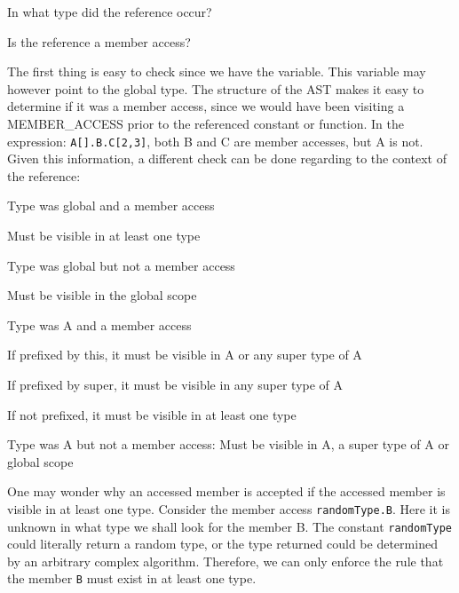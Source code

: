 \begin{nlist}
  \item In what type did the reference occur?
  \item Is the reference a member access?
\end{nlist}

The first thing is easy to check since we have the 
variable. This variable may however point to the global type. The structure of
the AST makes it easy to determine if it was a member access, since we would
have been visiting a MEMBER\_ACCESS  prior to the referenced
constant or function. In the expression: \texttt{A[].B.C[2,3]}, both B and C are
member accesses, but A is not. Given this information, a different check can be
done regarding to the context of the reference:

\begin{nlist}
  \item Type was global and a member access
  \begin{dlist}
    \item Must be visible in at least one type
  \end{dlist} 
  \item Type was global but not a member access
  \begin{dlist}
    \item Must be visible in the global scope
  \end{dlist}
  \item Type was A and a member access
  \begin{dlist}
    \item If prefixed by this, it must be visible in A or any super type of A
    \item If prefixed by super, it must be visible in any super type of A
    \item If not prefixed, it must be visible in at least one type
  \end{dlist}
  \item Type was A but not a member access: Must be visible in A, a super type
    of A or global scope
\end{nlist}

One may wonder why an accessed member is accepted if the accessed member is
visible in at least one type. Consider the member access \texttt{randomType.B}.
Here it is unknown in what type we shall look for the member B. The constant
\texttt{randomType} could literally return a random type, or the type returned
could be determined by an arbitrary complex algorithm. Therefore, we can only
enforce the rule that the member \texttt{B} must exist in at least one type.

